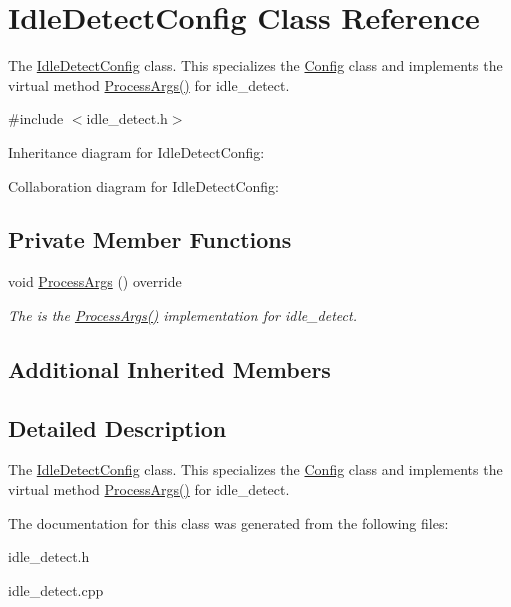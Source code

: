 \hypertarget{classIdleDetectConfig}{}\section{Idle\+Detect\+Config Class Reference}
\label{classIdleDetectConfig}


The \mbox{\hyperlink{classIdleDetectConfig}{Idle\+Detect\+Config}} class. This specializes the \mbox{\hyperlink{classConfig}{Config}} class and implements the virtual method \mbox{\hyperlink{classIdleDetectConfig_a9272359043cbf60dae0f5f1ac205a54a}{Process\+Args()}} for idle\+\_\+detect.  




{\ttfamily \#include $<$idle\+\_\+detect.\+h$>$}



Inheritance diagram for Idle\+Detect\+Config\+:


Collaboration diagram for Idle\+Detect\+Config\+:
\subsection*{Private Member Functions}
\begin{DoxyCompactItemize}
\item 
\mbox{\label{classIdleDetectConfig_a9272359043cbf60dae0f5f1ac205a54a}} 
void \mbox{\hyperlink{classIdleDetectConfig_a9272359043cbf60dae0f5f1ac205a54a}{Process\+Args}} () override
\begin{DoxyCompactList}\small\item\em The is the \mbox{\hyperlink{classIdleDetectConfig_a9272359043cbf60dae0f5f1ac205a54a}{Process\+Args()}} implementation for idle\+\_\+detect. \end{DoxyCompactList}\end{DoxyCompactItemize}
\subsection*{Additional Inherited Members}


\subsection{Detailed Description}
The \mbox{\hyperlink{classIdleDetectConfig}{Idle\+Detect\+Config}} class. This specializes the \mbox{\hyperlink{classConfig}{Config}} class and implements the virtual method \mbox{\hyperlink{classIdleDetectConfig_a9272359043cbf60dae0f5f1ac205a54a}{Process\+Args()}} for idle\+\_\+detect. 

The documentation for this class was generated from the following files\+:\begin{DoxyCompactItemize}
\item 
idle\+\_\+detect.\+h\item 
idle\+\_\+detect.\+cpp\end{DoxyCompactItemize}
